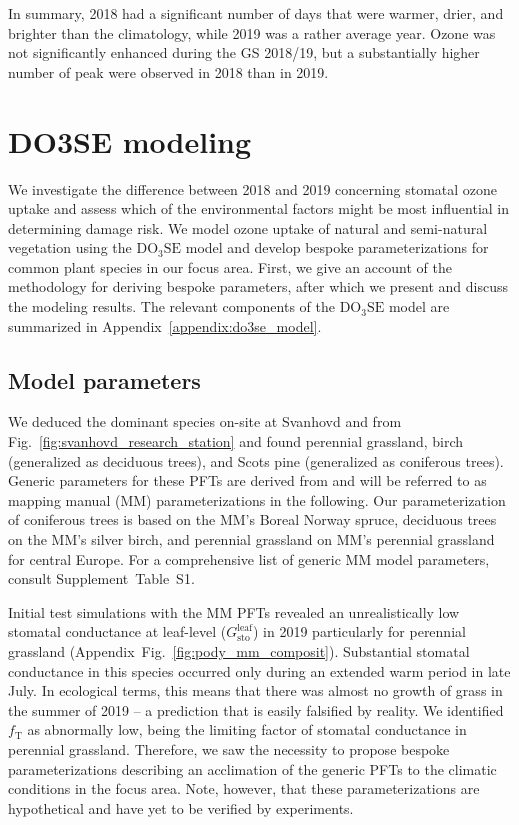\documentclass[bg, manuscript]{copernicus}
\begin{document}
In summary, 2018 had a significant number of days that were warmer, drier, and brighter than the climatology, while 2019 was a rather average year. Ozone was not significantly enhanced during the GS 2018/19, but a substantially higher number of peak \chem{[O_3]} were observed in 2018 than in 2019.

\section{DO3SE modeling}
\label{sec:do3se}
We investigate the difference between 2018 and 2019 concerning stomatal ozone uptake and assess which of the environmental factors might be most influential in determining  damage risk. We model ozone uptake of natural and semi-natural vegetation using the $\mathrm{DO_3SE}$ model \citep{ACP:Bueker2012} and develop bespoke parameterizations for common plant species in our focus area. First, we give an account of the methodology for deriving bespoke parameters, after which we present and discuss the modeling results. The relevant components of the $\mathrm{DO_3SE}$ model are summarized in Appendix~\ref{appendix:do3se_model}.

\subsection{Model parameters}
\label{subsec:do3se_parameters}

We deduced the dominant species on-site at Svanhovd and from Fig.~\ref{fig:svanhovd_research_station} and found perennial grassland, birch (generalized as deciduous trees), and Scots pine (generalized as coniferous trees). Generic parameters for these PFTs are derived from \citet{EP:Simpson2007,GCB:Mills2011,ICP:MappingManual2017} and will be referred to as mapping manual (MM) parameterizations in the following. Our parameterization of coniferous trees is based on the MM's Boreal Norway spruce, deciduous trees on the MM's silver birch, and perennial grassland on MM's perennial grassland for central Europe. For a comprehensive list of generic MM model parameters, consult Supplement~Table~S1.

Initial test simulations with the MM PFTs revealed an unrealistically low stomatal conductance at leaf-level ($G_\mathrm{sto}^\mathrm{leaf}$) in 2019 particularly for perennial grassland (Appendix~Fig.~\ref{fig:pody_mm_composit}). Substantial stomatal conductance in this species occurred only during an extended warm period in late July. In ecological terms, this means that there was almost no growth of grass in the summer of 2019 -- a prediction that is easily falsified by reality. We identified $f_\mathrm{T}$ as abnormally low, being the limiting factor of stomatal conductance in perennial grassland. Therefore, we saw the necessity to propose bespoke parameterizations describing an acclimation of the generic PFTs to the climatic conditions in the focus area. Note, however, that these parameterizations are hypothetical and have yet to be verified by experiments. 
\end{document}
